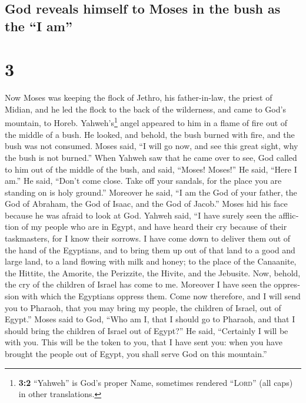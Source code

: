 \begin{paracol}{2}
\switchcolumn
\begin{otherlanguage}{english}

\hypertarget{god-reveals-himself-to-moses-in-the-bush-as-the-i-am}{%
\subsection{God reveals himself to Moses in the bush as the ``I
am''}\label{god-reveals-himself-to-moses-in-the-bush-as-the-i-am}}

\hypertarget{section-5}{%
\section{3}\label{section-5}}

 Now Moses was keeping the flock of Jethro, his
father-in-law, the priest of Midian, and he led the flock to the back of
the wilderness, and came to God's mountain, to Horeb. 
Yahweh's\footnote{\textbf{3:2} ``Yahweh'' is God's proper Name,
  sometimes rendered ``\textsc{Lord}'' (all caps) in other translations.}
angel appeared to him in a flame of fire out of the middle of a bush. He
looked, and behold, the bush burned with fire, and the bush was not
consumed.  Moses said, ``I will go now, and see this great
sight, why the bush is not burned.''  When Yahweh saw that
he came over to see, God called to him out of the middle of the bush,
and said, ``Moses! Moses!'' He said, ``Here I am.''  He
said, ``Don't come close. Take off your sandals, for the place you are
standing on is holy ground.''  Moreover he said, ``I am
the God of your father, the God of Abraham, the God of Isaac, and the
God of Jacob.'' Moses hid his face because he was afraid to look at God.
 Yahweh said, ``I have surely seen the affliction of my
people who are in Egypt, and have heard their cry because of their
taskmasters, for I know their sorrows.  I have come down
to deliver them out of the hand of the Egyptians, and to bring them up
out of that land to a good and large land, to a land flowing with milk
and honey; to the place of the Canaanite, the Hittite, the Amorite, the
Perizzite, the Hivite, and the Jebusite.  Now, behold, the
cry of the children of Israel has come to me. Moreover I have seen the
oppression with which the Egyptians oppress them.  Come
now therefore, and I will send you to Pharaoh, that you may bring my
people, the children of Israel, out of Egypt.''  Moses
said to God, ``Who am I, that I should go to Pharaoh, and that I should
bring the children of Israel out of Egypt?''  He said,
``Certainly I will be with you. This will be the token to you, that I
have sent you: when you have brought the people out of Egypt, you shall
serve God on this mountain.''


\end{otherlanguage}
\end{paracol}
